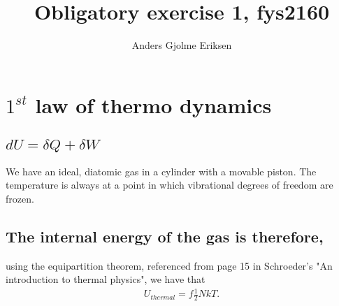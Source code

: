 \documentclass[a4paper,11pt]{article}
\title{Obligatory exercise 1, fys2160}
\author{Anders Gjolme Eriksen}
\begin{document}
\maketitle

\section{$1^{st}$ law of thermo dynamics}
\subsection*{$dU = \delta Q + \delta W$}
We have an ideal, diatomic gas in a cylinder with a movable piston. The temperature is always at a point in which vibrational degrees of freedom are frozen. 
\subsection*{The internal energy of the gas is therefore,}
using the equipartition theorem, referenced from page 15 in Schroeder's "An introduction to thermal physics", we have that 
\begin{align*}
U_{thermal} = f \frac{1}{2} N k T.
\end{align*}
\end{document}
